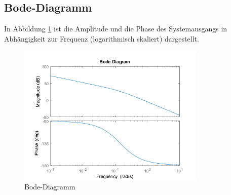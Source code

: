 \subsection{Bode-Diagramm}

In Abbildung \ref{fig:bode-diagram} ist die Amplitude und die Phase des Systemausgangs in Abhängigkeit zur Frequenz (logarithmisch skaliert) dargestellt.

\begin{figure}[H]
	\centering
	\includegraphics[width=0.8\textwidth]{"diagrams/bode diagram"}
	\caption[Bode-Diagramm]{Bode-Diagramm}
	\label{fig:bode-diagram}
\end{figure}
